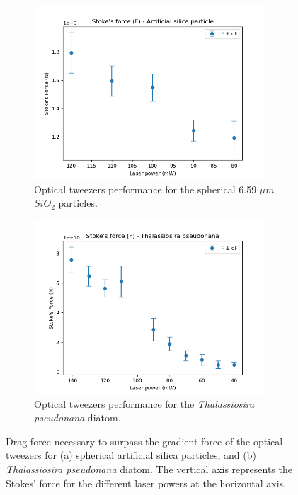 \documentclass[letterpaper,12pt,oneside]{book}
\begin{document}
\begin{figure}[H]
     \centering
     \begin{subfigure}[b]{0.49\textwidth}
         \centering         \includegraphics[width=0.95\textwidth]{Newplots_microfluidics_results/Force_silica_particle.png}
         \caption{Optical tweezers performance for the spherical 6.59 $\mu m$ $SiO_2$ particles.}
         \label{fig:yx}
     \end{subfigure}
     \hfill
     \begin{subfigure}[b]{0.49\textwidth}
         \centering
         \includegraphics[width=0.95\textwidth]{Newplots_microfluidics_results/Force_Thalassiosira.png}
         \caption{Optical tweezers performance for the \textit{Thalassiosira pseudonana} diatom.}
         \label{figx}
     \end{subfigure}
     \caption{Drag force necessary to surpass the gradient force of the optical tweezers for (a) spherical artificial silica particles, and (b) \textit{Thalassiosira pseudonana} diatom. The vertical axis represents the Stokes' force for the different laser powers at the horizontal axis.}
     \hfill
    \label{forces_microfluidcs} 
\end{figure}
\end{document}
